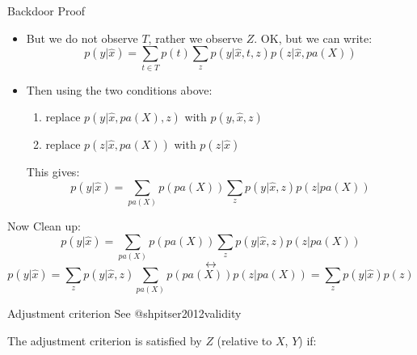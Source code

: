 \documentclass[
  11pt,
  ignorenonframetext,
]{beamer}
\providecommand{\tightlist}{%
  \setlength{\itemsep}{0pt}\setlength{\parskip}{0pt}}\usepackage{longtable,booktabs,array}
\begin{document}
\begin{frame}{Backdoor Proof}
\protect\hypertarget{backdoor-proof-1}{}
\begin{itemize}
\item
  But we do not observe \(T\), rather we observe \(Z\). OK, but we can
  write:
  \[p(y|\hat{x}) = \sum_{t\in T} p(t) \sum_z p(y|\hat{x}, t, z)p(z|\hat{x}, pa(X))\]
\item
  Then using the two conditions above:

  \begin{enumerate}
  \tightlist
  \item
    replace \(p(y|\hat{x}, pa(X), z)\) with \(p(y, \hat{x}, z)\)
  \item
    replace \(p(z|\hat{x}, pa(X))\) with \(p(z|\hat{x})\)
  \end{enumerate}

  This gives:
  \[p(y|\hat{x}) = \sum_{pa(X)} p(pa(X)) \sum_z p(y|\hat{x}, z)p(z|pa(X)) \]
\end{itemize}
\end{frame}

\begin{frame}{Now Clean up:}
\protect\hypertarget{now-clean-up}{}
\[p(y|\hat{x}) = \sum_{pa(X)} p(pa(X)) \sum_z p(y|\hat{x}, z)p(z|pa(X))\]
\[\leftrightarrow\]
\[p(y|\hat{x}) =  \sum_z p(y|\hat{x}, z)\sum_{pa(X)} p(pa(X))p(z|pa(X)) = \sum_z p(y|\hat{x})p(z)\]
\end{frame}

\begin{frame}{Adjustment criterion}
\protect\hypertarget{adjustment-criterion}{}
See @shpitser2012validity

The adjustment criterion is satisfied by \(Z\) (relative to \(X\),
\(Y\)) if:

\end{frame}
\end{document}
